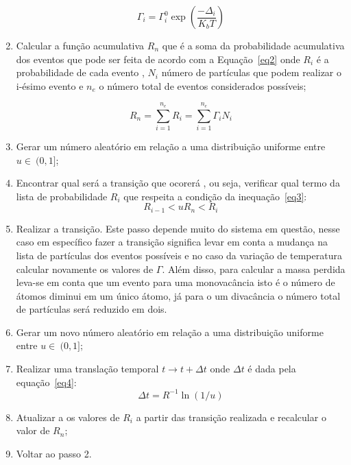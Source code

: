 \documentclass[11pt]{article}
\begin{document}
\begin{enumerate}
    \begin{equation}
        \Gamma_i = \Gamma_{i}^{0}\exp{\left({\frac{-\Delta_i}{K_b T}}\right)}
        \label{eq1}
    \end{equation}

\item Calcular a função acumulativa $R_n$ que é a soma da probabilidade acumulativa dos eventos que pode ser feita de acordo com a Equação~\ref{eq2} onde $R_i$ é a probabilidade de cada evento , $N_i$ número de partículas que podem realizar o i-ésimo evento e $n_e$ o número total de eventos considerados possíveis;

    \begin{equation}
        R_n = \sum_{i=1}^{n_e} R_i = \sum_{i=1}^{n_e} \Gamma_i N_i
        \label{eq2}
    \end{equation}

\item Gerar um número aleatório em relação a uma distribuição uniforme entre $u \in~(0,1]$;
\item Encontrar qual será a transição que ocorerá , ou seja, verificar qual termo da lista de probabilidade $R_i$ que respeita a condição da inequação~\ref{eq3}:
    \begin{equation}
    R_{i-1} < uR_n < R_i
    \label{eq3}
    \end{equation}

\item Realizar a transição. Este passo depende muito do sistema em questão, nesse caso em específico fazer a transição significa levar em conta a mudança na lista de partículas dos eventos possíveis e no caso da variação de temperatura calcular novamente os valores de $\Gamma$. Além disso, para calcular a massa perdida leva-se em conta que um evento para uma monovacância isto é o número de átomos diminui em um único átomo, já para o um divacância o número total de partículas será reduzido em dois.

\item Gerar um novo número aleatório em relação a uma distribuição uniforme entre $u \in~(0,1]$;
\item Realizar uma translação temporal $t \rightarrow t+\Delta t$ onde $\Delta t$ é dada pela equação~\ref{eq4}:
    \begin{equation}
        \Delta t = R^{-1} \ln{(1/u)}
        \label{eq4}
    \end{equation}

\item Atualizar a os valores de $R_i$ a partir das transição realizada e recalcular o valor de $R_n$;
\item Voltar ao passo 2.

\end{enumerate}
\end{document}
